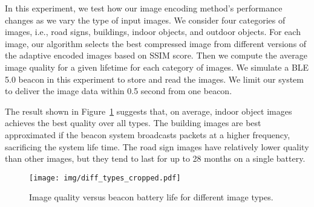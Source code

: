 In this experiment, we test how our image encoding method's performance changes as we vary the type of input images. We consider four categories of images, i.e., road signs, buildings, indoor objects, and outdoor objects. For each image, our algorithm selects the best compressed image from different versions of the adaptive encoded images based on SSIM score. Then we compute the average image quality for a given lifetime for each category of images. We simulate a BLE 5.0 beacon in this experiment to store and read the images. We limit our system to deliver the image data within 0.5 second from one beacon.

The result shown in Figure~\ref{fig:diff_types} suggests that, on average, indoor object images achieves the best quality over all types. The building images are best approximated if the beacon system broadcasts packets at a higher frequency, sacrificing the system life time. The road sign images have relatively lower quality than other images, but they tend to last for up to 28 months on a single battery.


\begin{figure}[!htb]
		\vspace{-1em}
	\begin{center}
		\texttt{[image: img/diff\_types\_cropped.pdf]}
		\caption{Image quality versus beacon battery life for different image types.}
		\label{fig:diff_types}
	\end{center}
\end{figure}


